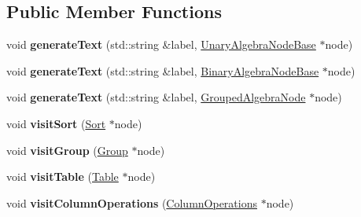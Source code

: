 \subsection*{Public Member Functions}
\begin{DoxyCompactItemize}
\item 
\hypertarget{class_graph_drawing_visitor_a613ff576e75d1bf181b5786a3b7eec63}{void {\bfseries generate\+Text} (std\+::string \&label, \hyperlink{class_unary_algebra_node_base}{Unary\+Algebra\+Node\+Base} $\ast$node)}\label{class_graph_drawing_visitor_a613ff576e75d1bf181b5786a3b7eec63}

\item 
\hypertarget{class_graph_drawing_visitor_a4cd34c4d34ae0a9fb1cefc801010db91}{void {\bfseries generate\+Text} (std\+::string \&label, \hyperlink{class_binary_algebra_node_base}{Binary\+Algebra\+Node\+Base} $\ast$node)}\label{class_graph_drawing_visitor_a4cd34c4d34ae0a9fb1cefc801010db91}

\item 
\hypertarget{class_graph_drawing_visitor_a67f47186f477b41da99574dc83ae2cee}{void {\bfseries generate\+Text} (std\+::string \&label, \hyperlink{class_grouped_algebra_node}{Grouped\+Algebra\+Node} $\ast$node)}\label{class_graph_drawing_visitor_a67f47186f477b41da99574dc83ae2cee}

\item 
\hypertarget{class_graph_drawing_visitor_aae222309bf242fc78da5add861cfde20}{void {\bfseries visit\+Sort} (\hyperlink{class_sort}{Sort} $\ast$node)}\label{class_graph_drawing_visitor_aae222309bf242fc78da5add861cfde20}

\item 
\hypertarget{class_graph_drawing_visitor_aabe646e1bc301a127722a54568479653}{void {\bfseries visit\+Group} (\hyperlink{class_group}{Group} $\ast$node)}\label{class_graph_drawing_visitor_aabe646e1bc301a127722a54568479653}

\item 
\hypertarget{class_graph_drawing_visitor_a396774ef87bd463ac1a588fef83b885a}{void {\bfseries visit\+Table} (\hyperlink{class_table}{Table} $\ast$node)}\label{class_graph_drawing_visitor_a396774ef87bd463ac1a588fef83b885a}

\item 
\hypertarget{class_graph_drawing_visitor_a8cc0865d330a29411e83261205382eeb}{void {\bfseries visit\+Column\+Operations} (\hyperlink{class_column_operations}{Column\+Operations} $\ast$node)}\label{class_graph_drawing_visitor_a8cc0865d330a29411e83261205382eeb}


\end{DoxyCompactItemize}
